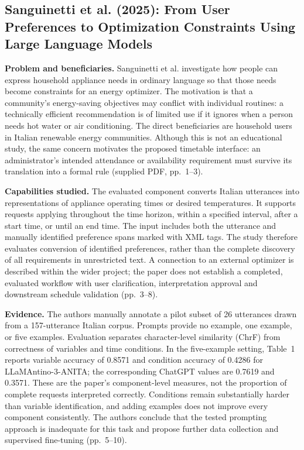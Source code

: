 \documentclass[
  11pt,a4paper,oneside]{report}
\begin{document}
\subsection{Sanguinetti et al. (2025): From User Preferences to Optimization Constraints Using Large Language Models}
\textbf{Problem and beneficiaries.} Sanguinetti et al. investigate how people can express household appliance needs in ordinary language so that those needs become constraints for an energy optimizer. The motivation is that a community's energy-saving objectives may conflict with individual routines: a technically efficient recommendation is of limited use if it ignores when a person needs hot water or air conditioning. The direct beneficiaries are household users in Italian renewable energy communities. Although this is not an educational study, the same concern motivates the proposed timetable interface: an administrator's intended attendance or availability requirement must survive its translation into a formal rule (supplied PDF, pp.~1--3).

\textbf{Capabilities studied.} The evaluated component converts Italian utterances into representations of appliance operating times or desired temperatures. It supports requests applying throughout the time horizon, within a specified interval, after a start time, or until an end time. The input includes both the utterance and manually identified preference spans marked with XML tags. The study therefore evaluates conversion of identified preferences, rather than the complete discovery of all requirements in unrestricted text. A connection to an external optimizer is described within the wider project; the paper does not establish a completed, evaluated workflow with user clarification, interpretation approval and downstream schedule validation (pp.~3--8).

\textbf{Evidence.} The authors manually annotate a pilot subset of 26 utterances drawn from a 157-utterance Italian corpus. Prompts provide no example, one example, or five examples. Evaluation separates character-level similarity (ChrF) from correctness of variables and time conditions. In the five-example setting, Table~1 reports variable accuracy of 0.8571 and condition accuracy of 0.4286 for LLaMAntino-3-ANITA; the corresponding ChatGPT values are 0.7619 and 0.3571. These are the paper's component-level measures, not the proportion of complete requests interpreted correctly. Conditions remain substantially harder than variable identification, and adding examples does not improve every component consistently. The authors conclude that the tested prompting approach is inadequate for this task and propose further data collection and supervised fine-tuning (pp.~5--10).
\end{document}
